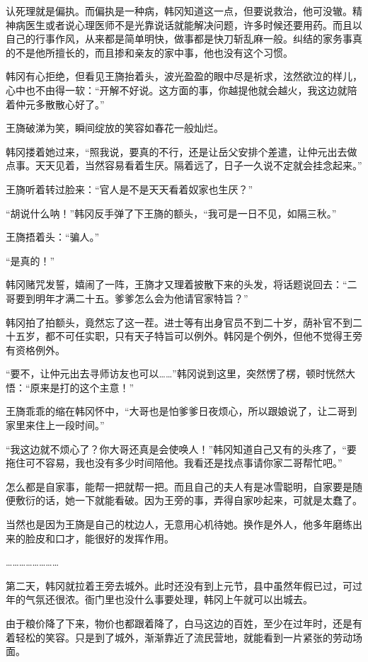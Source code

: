 认死理就是偏执。而偏执是一种病，韩冈知道这一点，但要说救治，他可没辙。精神病医生或者说心理医师不是光靠说话就能解决问题，许多时候还要用药。而且以自己的行事作风，从来都是简单明快，做事都是快刀斩乱麻一般。纠结的家务事真的不是他所擅长的，而且掺和亲友的家中事，他也没有这个习惯。

韩冈有心拒绝，但看见王旖抬着头，波光盈盈的眼中尽是祈求，泫然欲泣的样儿，心中也不由得一软：“开解不好说。这方面的事，你越提他就会越火，我这边就陪着仲元多散散心好了。”

王旖破涕为笑，瞬间绽放的笑容如春花一般灿烂。

韩冈搂着她过来，“照我说，要真的不行，还是让岳父安排个差遣，让仲元出去做点事。天天见着，当然容易看着生厌。隔着远了，日子一久说不定就会挂念起来。”

王旖听着转过脸来：“官人是不是天天看着奴家也生厌？”

“胡说什么呐！”韩冈反手弹了下王旖的额头，“我可是一日不见，如隔三秋。”

王旖捂着头：“骗人。”

“是真的！”

韩冈赌咒发誓，嬉闹了一阵，王旖才又理着披散下来的头发，将话题说回去：“二哥要到明年才满二十五。爹爹怎么会为他请官家特旨？”

韩冈拍了拍额头，竟然忘了这一茬。进士等有出身官员不到二十岁，荫补官不到二十五岁，都不可任实职，只有天子特旨可以例外。韩冈是个例外，但他不觉得王旁有资格例外。

“要不，让仲元出去寻师访友也可以……”韩冈说到这里，突然愣了楞，顿时恍然大悟：“原来是打的这个主意！”

王旖乖乖的缩在韩冈怀中，“大哥也是怕爹爹日夜烦心，所以跟娘说了，让二哥到家里来住上一段时间。”

“我这边就不烦心了？你大哥还真是会使唤人！”韩冈知道自己又有的头疼了，“要拖住可不容易，我也没有多少时间陪他。我看还是找点事请你家二哥帮忙吧。”

怎么都是自家事，能帮一把就帮一把。而且自己的夫人有是冰雪聪明，自家要是随便敷衍的话，她一下就能看破。因为王旁的事，弄得自家吵起来，可就是太蠢了。

当然也是因为王旖是自己的枕边人，无意用心机待她。换作是外人，他多年磨练出来的脸皮和口才，能很好的发挥作用。

……………………

第二天，韩冈就拉着王旁去城外。此时还没有到上元节，县中虽然年假已过，可过年的气氛还很浓。衙门里也没什么事要处理，韩冈上午就可以出城去。

由于粮价降了下来，物价也都跟着降了，白马这边的百姓，至少在过年时，还是有着轻松的笑容。只是到了城外，渐渐靠近了流民营地，就能看到一片紧张的劳动场面。

